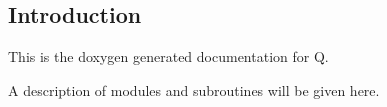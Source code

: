 \hypertarget{index_Introduction}{}\subsection{Introduction}\label{index_Introduction}
This is the doxygen generated documentation for Q.

A description of modules and subroutines will be given here.

 